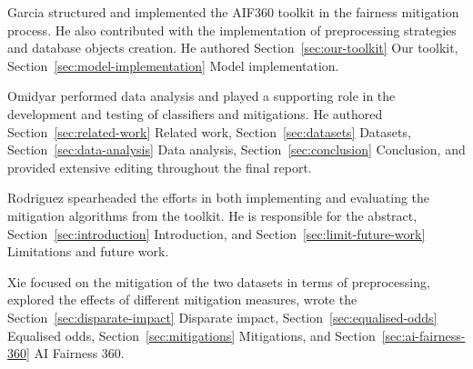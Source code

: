 \documentclass[runningheads]{llncs}
\begin{document}
Garcia structured and implemented the AIF360 toolkit in the fairness
mitigation process. He also contributed with the implementation of
preprocessing strategies and database objects creation. He authored
Section~\ref{sec:our-toolkit} Our toolkit,
Section~\ref{sec:model-implementation} Model implementation.

Omidyar performed data analysis and played a supporting role in the
development and testing of classifiers and mitigations. He authored
Section~\ref{sec:related-work} Related work,
Section~\ref{sec:datasets} Datasets, Section~\ref{sec:data-analysis}
Data analysis, Section~\ref{sec:conclusion} Conclusion, and provided
extensive editing throughout the final report.

Rodriguez spearheaded the efforts in both implementing and evaluating
the mitigation algorithms from the toolkit. He is responsible for the
abstract, Section~\ref{sec:introduction} Introduction, and
Section~\ref{sec:limit-future-work} Limitations and future work.

Xie focused on the mitigation of the two datasets in terms of
preprocessing, explored the effects of different mitigation measures,
wrote the Section~\ref{sec:disparate-impact} Disparate impact,
Section~\ref{sec:equalised-odds} Equalised odds,
Section~\ref{sec:mitigations} Mitigations, and
Section~\ref{sec:ai-fairness-360} AI Fairness 360.

 
\end{document}
